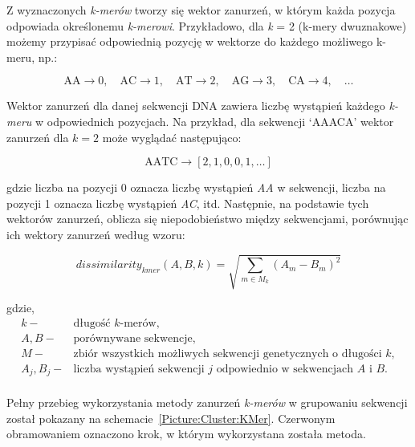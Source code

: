             Z wyznaczonych \textit{k-merów} tworzy się wektor zanurzeń, w którym każda pozycja odpowiada określonemu \textit{k-merowi}. Przykładowo, dla \textit{k} = 2 (k-mery dwuznakowe) możemy przypisać odpowiednią pozycję w wektorze do każdego możliwego k-meru, np.:
            
            \[
            \text{AA} \to 0, \quad \text{AC} \to 1, \quad \text{AT} \to 2, \quad \text{AG} \to 3, \quad \text{CA} \to 4, \quad \dots
            \]
            
            Wektor zanurzeń dla danej sekwencji DNA zawiera liczbę wystąpień każdego \textit{k-meru} w odpowiednich pozycjach. Na przykład, dla sekwencji `AAACA' wektor zanurzeń dla $k=2$ może wyglądać następująco:
            
            \[
            \text{AATC} \to [2, 1, 0, 0, 1, \dots]
            \]
            
            gdzie liczba na pozycji 0 oznacza liczbę wystąpień \textit{AA} w sekwencji, liczba na pozycji 1 oznacza liczbę wystąpień \textit{AC}, itd. Następnie, na podstawie tych wektorów zanurzeń, oblicza się niepodobieństwo między sekwencjami, porównując ich wektory zanurzeń według wzoru:

            \begin{equation}
                dissimilarity_{kmer}(A, B, k) = \sqrt{\sum_{m \in M_{k}} (A_m - B_m)^{2}}
            \end{equation}

            gdzie,
            \begin{align*} 
                k -& \text{długość $k$-merów}, \\
                A, B -& \text{porównywane sekwencje}, \\
                M -& \text{zbiór wszystkich możliwych sekwencji genetycznych o długości $k$}, \\
                A_j, B_j -& \text{liczba wystąpień sekwencji } j \text{ odpowiednio w sekwencjach } A \text{ i } B. \\
            \end{align*}

            Pełny przebieg wykorzystania metody zanurzeń \textit{k-merów} w grupowaniu sekwencji został pokazany na schemacie~\ref{Picture:Cluster:KMer}. Czerwonym obramowaniem oznaczono krok, w którym wykorzystana została metoda.


